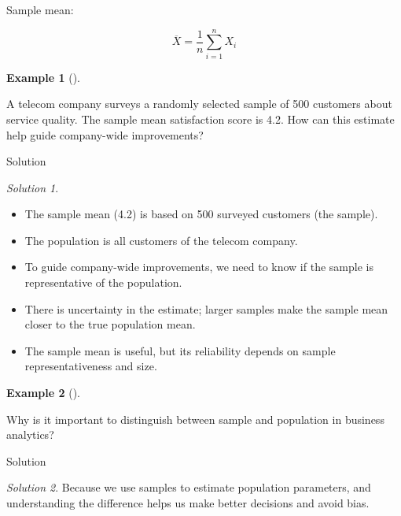 \documentclass[
  12pt,
  a4paper,
]{scrbook}
\providecommand{\tightlist}{%
  \setlength{\itemsep}{0pt}\setlength{\parskip}{0pt}}
\renewcommand{\tightlist}{\setlength{\itemsep}{0.5\baselineskip}\setlength{\parskip}{0.2\baselineskip}}
\theoremstyle{plain}
\theoremstyle{definition}
\newtheorem{example}{Example}[chapter]
\theoremstyle{remark}
\newtheorem{refsolution}{Solution}[chapter]
\begin{document}
Sample mean:

\[
\overline{X} = \frac{1}{n} \sum_{i=1}^n X_i
\]

\begin{example}[]\protect\hypertarget{exm-telecom}{}\label{exm-telecom}

A telecom company surveys a randomly selected sample of 500 customers
about service quality. The sample mean satisfaction score is 4.2. How
can this estimate help guide company-wide improvements?

\end{example}

Solution

\begin{refsolution}
\leavevmode

\begin{itemize}
\tightlist
\item
  The sample mean (4.2) is based on 500 surveyed customers (the sample).
\item
  The population is all customers of the telecom company.
\item
  To guide company-wide improvements, we need to know if the sample is
  representative of the population.
\item
  There is uncertainty in the estimate; larger samples make the sample
  mean closer to the true population mean.
\item
  The sample mean is useful, but its reliability depends on sample
  representativeness and size.
\end{itemize}

\label{sol-telecom}

\end{refsolution}

\begin{example}[]\protect\hypertarget{exm-3}{}\label{exm-3}

Why is it important to distinguish between sample and population in
business analytics?

\end{example}

Solution

\begin{refsolution}
\leavevmode

Because we use samples to estimate population parameters, and
understanding the difference helps us make better decisions and avoid
bias.

\label{sol-3}

\end{refsolution}
\end{document}
